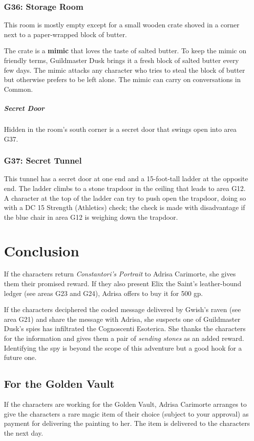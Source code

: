 \documentclass[10pt,a4paper,twoside,bg=print,twocolumn,openany,nodeprecatedcode]{dndbook}
\begin{document}
\subsubsection{G36: Storage Room}
\begin{DndReadAloud}{}
This room is mostly empty except for a small wooden crate shoved in a corner next to a paper-wrapped block of butter.

\end{DndReadAloud}

The crate is a \textbf{mimic} that loves the taste of salted butter. To keep the mimic on friendly terms, Guildmaster Dusk brings it a fresh block of salted butter every few days. The mimic attacks any character who tries to steal the block of butter but otherwise prefers to be left alone. The mimic can carry on conversations in Common.

\subparagraph{Secret Door}
Hidden in the room's south corner is a secret door that swings open into area G37.

\subsubsection{G37: Secret Tunnel}
This tunnel has a secret door at one end and a 15-foot-tall ladder at the opposite end. The ladder climbs to a stone trapdoor in the ceiling that leads to area G12. A character at the top of the ladder can try to push open the trapdoor, doing so with a DC 15 Strength (Athletics) check; the check is made with disadvantage if the blue chair in area G12 is weighing down the trapdoor.

\section{Conclusion}
If the characters return \textit{Constantori's Portrait} to Adrisa Carimorte, she gives them their promised reward. If they also present Elix the Saint's leather-bound ledger (see areas G23 and G24), Adrisa offers to buy it for 500 gp.

If the characters deciphered the coded message delivered by Gwish's raven (see area G21) and share the message with Adrisa, she suspects one of Guildmaster Dusk's spies has infiltrated the Cognoscenti Esoterica. She thanks the characters for the information and gives them a pair of \textit{sending stones} as an added reward. Identifying the spy is beyond the scope of this adventure but a good hook for a future one.

\subsection{For the Golden Vault}
If the characters are working for the Golden Vault, Adrisa Carimorte arranges to give the characters a rare magic item of their choice (subject to your approval) as payment for delivering the painting to her. The item is delivered to the characters the next day.
\end{document}
